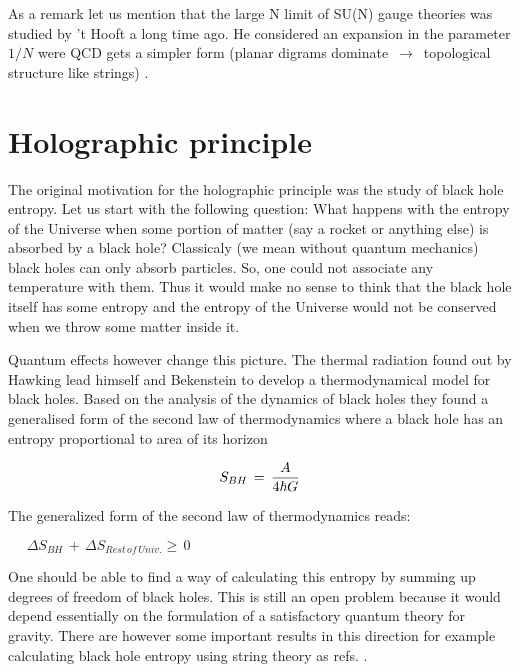 \documentclass[a4paper,twocolumn,prd,groupedaddress,nofootinbib]{revtex4}
\begin{document}
\bigskip 
As a remark let us mention that the large N limit of SU(N) gauge theories was studied
by 't Hooft a long time ago. He considered an expansion in the parameter $ 1/N$ 
were QCD gets a simpler form (planar digrams dominate $\,\rightarrow\,$ topological 
structure like strings) \cite{to}.
 
\bigskip
\section{Holographic principle}
The original motivation for the holographic principle was the study 
of black hole entropy. Let us start with the following question:  What happens with 
the entropy of the Universe when some portion of matter (say a rocket or anything else)
is absorbed by a black hole?
Classicaly (we mean without quantum mechanics) black holes can only absorb particles.
So, one could not associate any temperature with them. Thus it would make no sense to 
think that the black hole itself has some entropy and the entropy of the Universe 
would not be conserved when we throw some matter inside it.

Quantum effects however change this picture. The thermal radiation found out by 
Hawking lead himself and Bekenstein\cite{Be,Ha} to develop a  thermodynamical model
for  black holes. Based on the analysis of the dynamics of black holes they found 
a generalised form of the second law of thermodynamics where a black hole has 
an entropy proportional to area of its horizon

\bigskip

\begin{equation}
\label{bhe}
S_{BH}\,=\,{A \over 4\hbar G} 
\end{equation}

\bigskip

\noindent The generalized form of the second law of thermodynamics reads:

\bigskip

$\,\,\,\,\,\,\,\,\Delta S_{BH} \,+\, \Delta S_{Rest \,of\, Univ.}  \ge \,0 \,\,$

\bigskip
One should be able to find a way of calculating this entropy by summing up degrees 
of freedom of black holes. This is still an open problem because it would
depend essentially on the formulation of a satisfactory quantum theory for gravity. 
There are however some important results in 
this direction for example calculating black hole entropy using string theory as 
refs. \cite{BHE1,BHE2}.
\end{document}
